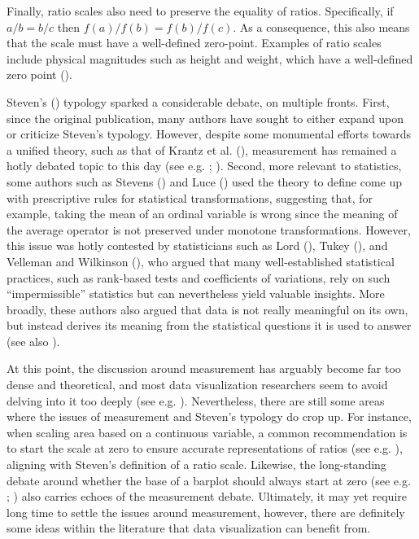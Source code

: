 \documentclass[
]{book}
\theoremstyle{definition}
\theoremstyle{definition}
\theoremstyle{definition}
\theoremstyle{definition}
\theoremstyle{remark}
\begin{document}
Finally, ratio scales also need to preserve the equality of ratios. Specifically, if \(a/b = b/c\) then \(f(a)/f(b) = f(b) / f(c)\). As a consequence, this also means that the scale must have a well-defined zero-point. Examples of ratio scales include physical magnitudes such as height and weight, which have a well-defined zero point ().

Steven's () typology sparked a considerable debate, on multiple fronts. First, since the original publication, many authors have sought to either expand upon or criticize Steven's typology. However, despite some monumental efforts towards a unified theory, such as that of Krantz et al. (), measurement has remained a hotly debated topic to this day (see e.g. ; ). Second, more relevant to statistics, some authors such as Stevens () and Luce () used the theory to define come up with prescriptive rules for statistical transformations, suggesting that, for example, taking the mean of an ordinal variable is wrong since the meaning of the average operator is not preserved under monotone transformations. However, this issue was hotly contested by statisticians such as Lord (), Tukey (), and Velleman and Wilkinson (), who argued that many well-established statistical practices, such as rank-based tests and coefficients of variations, rely on such ``impermissible'' statistics but can nevertheless yield valuable insights. More broadly, these authors also argued that data is not really meaningful on its own, but instead derives its meaning from the statistical questions it is used to answer (see also ).

At this point, the discussion around measurement has arguably become far too dense and theoretical, and most data visualization researchers seem to avoid delving into it too deeply (see e.g. ). Nevertheless, there are still some areas where the issues of measurement and Steven's typology do crop up. For instance, when scaling area based on a continuous variable, a common recommendation is to start the scale at zero to ensure accurate representations of ratios (see e.g. ), aligning with Steven's definition of a ratio scale. Likewise, the long-standing debate around whether the base of a barplot should always start at zero (see e.g. ; ) also carries echoes of the measurement debate. Ultimately, it may yet require long time to settle the issues around measurement, however, there are definitely some ideas within the literature that data visualization can benefit from.
\end{document}
